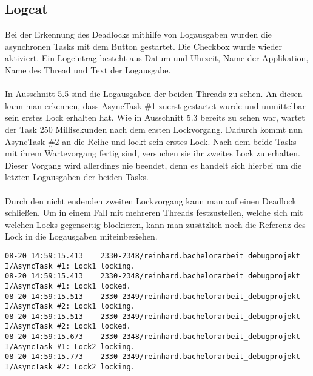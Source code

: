 \subsection{Logcat}
Bei der Erkennung des Deadlocks mithilfe von Logausgaben wurden die asynchronen Tasks mit dem Button  gestartet. Die Checkbox  wurde wieder aktiviert. Ein Logeintrag besteht aus Datum und Uhrzeit, Name der Applikation, Name des Thread und Text der Logausgabe. 
\\
\\
In Ausschnitt 5.5 sind die Logausgaben der beiden Threads zu sehen. An diesen kann man erkennen, dass AsyncTask \#1 zuerst gestartet wurde und unmittelbar sein erstes Lock erhalten hat. Wie in Ausschnitt 5.3 bereits zu sehen war, wartet der Task 250 Millisekunden nach dem ersten Lockvorgang. Dadurch kommt nun AsyncTask \#2 an die Reihe und lockt sein erstes Lock. Nach dem beide Tasks mit ihrem Wartevorgang fertig sind, versuchen sie ihr zweites Lock zu erhalten. Dieser Vorgang wird allerdings nie beendet, denn es handelt sich hierbei um die letzten Logausgaben der beiden Tasks.
\\
\\
Durch den nicht endenden zweiten Lockvorgang kann man auf einen Deadlock schließen. Um in einem Fall mit mehreren Threads festzustellen, welche sich mit welchen Locks gegenseitig blockieren, kann man zusätzlich noch die Referenz des Lock in die Logausgaben miteinbeziehen.

\begin{lstlisting}[float,floatplacement=H,caption=Logausgaben mit Deadlock]
08-20 14:59:15.413    2330-2348/reinhard.bachelorarbeit_debugprojekt I/AsyncTask #1: Lock1 locking.
08-20 14:59:15.413    2330-2348/reinhard.bachelorarbeit_debugprojekt I/AsyncTask #1: Lock1 locked.
08-20 14:59:15.513    2330-2349/reinhard.bachelorarbeit_debugprojekt I/AsyncTask #2: Lock1 locking.
08-20 14:59:15.513    2330-2349/reinhard.bachelorarbeit_debugprojekt I/AsyncTask #2: Lock1 locked.
08-20 14:59:15.673    2330-2348/reinhard.bachelorarbeit_debugprojekt I/AsyncTask #1: Lock2 locking.
08-20 14:59:15.773    2330-2349/reinhard.bachelorarbeit_debugprojekt I/AsyncTask #2: Lock2 locking.
\end{lstlisting}


